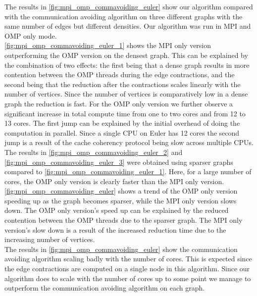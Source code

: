 The results in \autoref{fig:mpi_omp_commavoiding_euler} show our algorithm compared with the
communication avoiding algorithm \cite{comm_avoiding} on three different graphs with the same
number of edges but different densities. Our algorithm was run in MPI and OMP only mode.\\
\autoref{fig:mpi_omp_commavoiding_euler_1} shows the MPI only version outperforming the OMP version
 on the densest graph. This can be explained by the combination of two effects:
the first being that a dense graph results in more contention between the OMP threads during the
edge contractions, and the second being that the reduction after the contractions scales linearly
with the number of vertices. Since the number of vertices is comparatively low in a dense graph the
reduction is fast. For the OMP only version we further observe a significant increase in total
compute time from one to two cores and from 12 to 13 cores. The first jump can be explained by the
initial overhead of doing the computation in parallel. Since a single CPU on Euler has 12 cores the
second jump is a result of the cache coherency protocol being slow across multiple CPUs.\\
The results in \autoref{fig:mpi_omp_commavoiding_euler_2} and
\autoref{fig:mpi_omp_commavoiding_euler_3} were obtained using sparser graphs compared to
\autoref{fig:mpi_omp_commavoiding_euler_1}. Here, for a large number of cores, the OMP only version
is clearly faster than the MPI only version. \autoref{fig:mpi_omp_commavoiding_euler} shows a trend
of the OMP only version speeding up as the graph becomes sparser, while the MPI only version slows
down. The OMP only version's speed up can be explained by the reduced contention between the OMP
threads due to the sparser graph. The MPI only version's slow down is a result of the increased
reduction time due to the increasing number of vertices.\\
The results in \autoref{fig:mpi_omp_commavoiding_euler} show the communication avoiding algorithm
scaling badly with the number of cores. This is expected since the edge contractions are computed
on a single node in this algorithm. Since our algorithm does to scale with the number of cores up
to some point we manage to outperform the communication avoiding algorithm on each graph.

